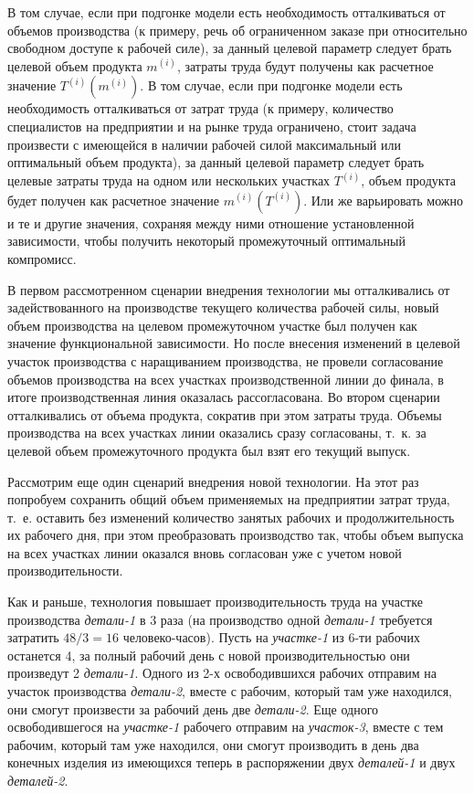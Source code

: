 \documentclass{article}
\let\textitorig\textit
\renewcommand{\textit}[1]{{\fontfamily{cmr}\selectfont \textitorig{#1}}}
\begin{document}
В том случае, если при подгонке модели есть необходимость отталкиваться от объемов производства (к примеру, речь об ограниченном заказе при относительно свободном доступе к рабочей силе), за данный целевой параметр следует брать целевой объем продукта $m^{(i)}$, затраты труда будут получены как расчетное значение $T^{(i)}(m^{(i)})$. В том случае, если при подгонке модели есть необходимость отталкиваться от затрат труда (к примеру, количество специалистов на предприятии и на рынке труда ограничено, стоит задача произвести с имеющейся в наличии рабочей силой максимальный или оптимальный объем продукта), за данный целевой параметр следует брать целевые затраты труда на одном или нескольких участках $T^{(i)}$, объем продукта будет получен как расчетное значение $m^{(i)}(T^{(i)})$. Или же варьировать можно и те и другие значения, сохраняя между ними отношение установленной зависимости, чтобы получить некоторый промежуточный оптимальный компромисс.

В первом рассмотренном сценарии внедрения технологии мы отталкивались от задействованного на производстве текущего количества рабочей силы, новый объем производства на целевом промежуточном участке был получен как значение функциональной зависимости. Но после внесения изменений в целевой участок производства с наращиванием производства, не провели согласование объемов производства на всех участках производственной линии до финала, в итоге производственная линия оказалась рассогласована. Во втором сценарии отталкивались от объема продукта, сократив при этом затраты труда. Объемы производства на всех участках линии оказались сразу согласованы, т.~к. за целевой объем промежуточного продукта был взят его текущий выпуск.

Рассмотрим еще один сценарий внедрения новой технологии. На этот раз попробуем сохранить общий объем применяемых на предприятии затрат труда, т.~е. оставить без изменений количество занятых рабочих и продолжительность их рабочего дня, при этом преобразовать производство так, чтобы объем выпуска на всех участках линии оказался вновь согласован уже с учетом новой производительности.

Как и раньше, технология повышает производительность труда на участке производства \textit{детали-1} в 3 раза (на производство одной \textit{детали-1} требуется затратить $48 / 3 = 16$ человеко-часов). Пусть на \textit{участке-1} из 6-ти рабочих останется 4, за полный рабочий день с новой производительностью они произведут 2 \textit{детали-1}. Одного из 2-х освободившихся рабочих отправим на участок производства \textit{детали-2}, вместе с рабочим, который там уже находился, они смогут произвести за рабочий день две \textit{детали-2}. Еще одного освободившегося на \textit{участке-1} рабочего отправим на \textit{участок-3}, вместе с тем рабочим, который там уже находился, они смогут производить в день два конечных изделия из имеющихся теперь в распоряжении двух \textit{деталей-1} и двух \textit{деталей-2}.
\end{document}
